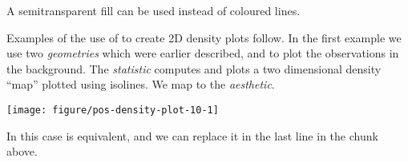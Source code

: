 \documentclass[krantz2]{krantz}\usepackage{knitr}%
\begin{document}
A semitransparent fill can be used instead of coloured lines.

\begin{knitrout}\footnotesize
{}\color{fgcolor}\begin{kframe}
\begin{alltt}
    \hlopt{+}
  \hlstd{(} \hlstd{=} \hlstd{)}
\end{alltt}
\end{kframe}
\end{knitrout}


Examples of the use of  to create 2D density plots follow. In the first example we use two \emph{geometries} which were earlier described,  and  to plot the observations in the background. The \emph{statistic} computes and plots a two dimensional density ``map'' plotted using isolines. We map  to the  \emph{aesthetic}.

\begin{knitrout}\footnotesize
{}\color{fgcolor}\begin{kframe}
\begin{alltt}
    \hlopt{+}
  \hlstd{()} \hlopt{+}
  \hlstd{()} \hlopt{+}
  \hlstd{()}
\end{alltt}
\end{kframe}

{\centering \texttt{[image: figure/pos-density-plot-10-1]} 

}



\end{knitrout}

In this case  is equivalent, and we can replace it in the last line in the chunk above.
\begin{knitrout}\footnotesize
{}\color{fgcolor}\begin{kframe}
\begin{alltt}
  \hlstd{()}
\end{alltt}
\end{kframe}
\end{knitrout}
\end{document}
